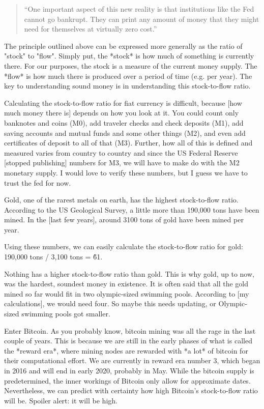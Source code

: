 \begin{quotation}
``One important aspect of this new reality is that institutions like
the Fed cannot go bankrupt. They can print any amount of money that
they might need for themselves at virtually zero cost.''
\end{quotation}

The principle outlined above can be expressed more generally as the
ratio of "stock" to "flow". Simply put, the *stock* is how much of
something is currently there. For our purposes, the stock is a measure
of the current money supply. The *flow* is how much there is produced
over a period of time (e.g. per year). The key to understanding sound
money is in understanding this stock-to-flow ratio.

Calculating the stock-to-flow ratio for fiat currency is difficult,
because [how much money there is] depends on how you look at it. You
could count only banknotes and coins (M0), add traveler checks and check
deposits (M1), add saving accounts and mutual funds and some other
things (M2), and even add certificates of deposit to all of that (M3).
Further, how all of this is defined and measured varies from country to
country and since the US Federal Reserve [stopped publishing] numbers
for M3, we will have to make do with the M2 monetary supply. I would
love to verify these numbers, but I guess we have to trust the fed for
now.

Gold, one of the rarest metals on earth, has the highest stock-to-flow
ratio. According to the US Geological Survey, a little more than 190,000
tons have been mined. In the [last few years], around 3100 tons of gold
have been mined per year.

Using these numbers, we can easily calculate the stock-to-flow ratio for
gold: 190,000 tons / 3,100 tons = \~61.

Nothing has a higher stock-to-flow ratio than gold. This is why gold, up
to now, was the hardest, soundest money in existence. It is often said
that all the gold mined so far would fit in two olympic-sized swimming
pools. According to [my calculations], we would need four. So maybe this
needs updating, or Olympic-sized swimming pools got smaller.

Enter Bitcoin. As you probably know, bitcoin mining was all the rage in
the last couple of years. This is because we are still in the early
phases of what is called the *reward era*, where mining nodes are
rewarded with *a lot* of bitcoin for their computational effort. We are
currently in reward era number 3, which began in 2016 and will end in
early 2020, probably in May. While the bitcoin supply is predetermined,
the inner workings of Bitcoin only allow for approximate dates.
Nevertheless, we can predict with certainty how high Bitcoin's
stock-to-flow ratio will be. Spoiler alert: it will be high.

